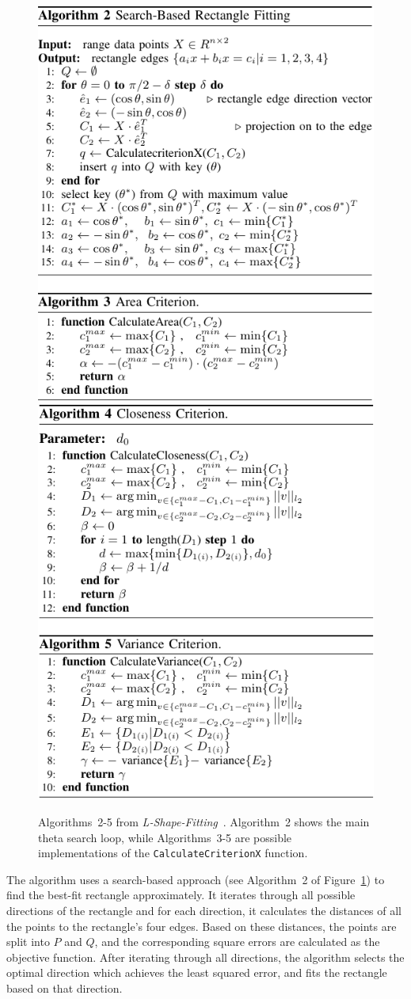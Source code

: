 \begin{figure}[htb]
    \includegraphics[width=0.49\linewidth]{figures/l_shape_fitting_fig_algs_1-cropped}
    \includegraphics[width=0.49\linewidth]{figures/l_shape_fitting_fig_algs_2-cropped}
    \caption{Algorithms~2-5 from \textit{L-Shape-Fitting}~\cite{zhang2017efficient}. Algorithm~2 shows the main theta search loop, while Algorithms~3-5 are possible implementations of the \texttt{CalculateCriterionX} function.}
    \label{fig:lsf-algs}
\end{figure}

The algorithm uses a search-based approach (see Algorithm~2 of Figure~\ref{fig:lsf-algs}) to find the best-fit rectangle approximately.
It iterates through all possible directions of the rectangle and for each direction, it calculates the distances of all the points to the rectangle's four edges.
Based on these distances, the points are split into $P$ and $Q$, and the corresponding square errors are calculated as the objective function.
After iterating through all directions, the algorithm selects the optimal direction which achieves the least squared error, and fits the rectangle based on that direction.

